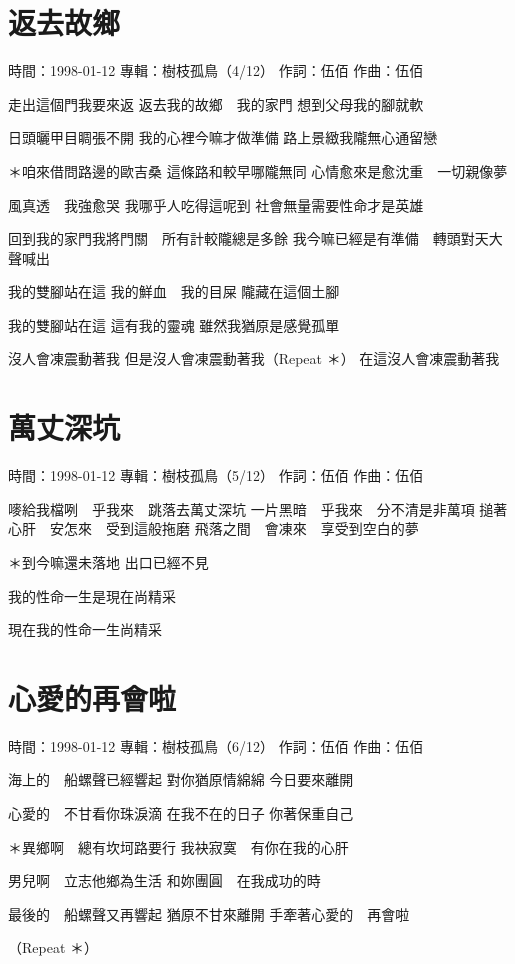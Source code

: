 \documentclass[UTF8,a4paper,oneside,twocolumn,12pt]{ctexbook}
\newcommand{\infopair}[2]{\textbullet #1：#2}
\newcommand{\zc}[1][伍佰]{\infopair{作詞}{#1}}
\newcommand{\zq}[1][伍佰]{\infopair{作曲}{#1}}
\newcommand{\zj}[1]{\infopair{專輯}{#1}}
\newcommand{\sj}[1]{\infopair{時間}{#1}}
\newenvironment{info}{\begin{flushleft}\kaishu
	}
	{\end{flushleft}\normalsize\yahei\par}
\newenvironment{lyric}{
	}
{}
\begin{document}
\section{返去故鄉}
\begin{info}
	\sj{1998-01-12}
	\zj{樹枝孤鳥（4/12）}
	\zc
	\zq
\end{info}
\begin{lyric}
	走出這個門我要來返 返去我的故鄉　我的家門
	想到父母我的腳就軟

	日頭曬甲目睭張不開 我的心裡今嘛才做準備
	路上景緻我隴無心通留戀

	＊咱來借問路邊的歐吉桑 這條路和較早哪隴無同
	心情愈來是愈沈重　一切親像夢

	風真透　我強愈哭 我哪乎人吃得這呢到
	社會無量需要性命才是英雄

	回到我的家門我將門關　所有計較隴總是多餘
	我今嘛已經是有準備　轉頭對天大聲喊出

	我的雙腳站在這 我的鮮血　我的目屎
	隴藏在這個土腳

	我的雙腳站在這 這有我的靈魂
	雖然我猶原是感覺孤單

	沒人會凍震動著我
	但是沒人會凍震動著我（Repeat ＊）
	在這沒人會凍震動著我
\end{lyric}

\section{萬丈深坑}
\begin{info}
	\sj{1998-01-12}
	\zj{樹枝孤鳥（5/12）}
	\zc
	\zq
\end{info}
\begin{lyric}
	嘜給我檔咧　乎我來　跳落去萬丈深坑
	一片黑暗　乎我來　分不清是非萬項
	搥著心肝　安怎來　受到這般拖磨
	飛落之間　會凍來　享受到空白的夢

	＊到今嘛還未落地
	出口已經不見

	我的性命一生是現在尚精采

	現在我的性命一生尚精采
\end{lyric}

\section{心愛的再會啦}
\begin{info}
	\sj{1998-01-12}
	\zj{樹枝孤鳥（6/12）}
	\zc
	\zq
\end{info}
\begin{lyric}
	海上的　船螺聲已經響起
	對你猶原情綿綿
	今日要來離開

	心愛的　不甘看你珠淚滴
	在我不在的日子
	你著保重自己

	＊異鄉啊　總有坎坷路要行
	我袂寂寞　有你在我的心肝

	男兒啊　立志他鄉為生活
	和妳團圓　在我成功的時

	最後的　船螺聲又再響起
	猶原不甘來離開
	手牽著心愛的　再會啦

	（Repeat ＊）
\end{lyric}
\end{document}
